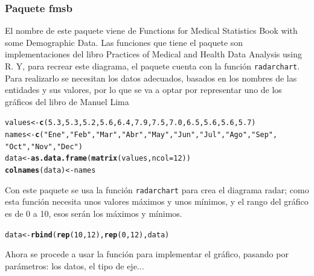 \documentclass{article}\usepackage[]{graphicx}\usepackage[]{color}
\makeatletter
\newcommand{\hlnum}[1]{\textcolor[rgb]{0.686,0.059,0.569}{#1}}%
\newcommand{\hlstr}[1]{\textcolor[rgb]{0.192,0.494,0.8}{#1}}%
\newcommand{\hlstd}[1]{\textcolor[rgb]{0.345,0.345,0.345}{#1}}%
\newcommand{\hlkwb}[1]{\textcolor[rgb]{0.69,0.353,0.396}{#1}}%
\newcommand{\hlkwc}[1]{\textcolor[rgb]{0.333,0.667,0.333}{#1}}%
\newcommand{\hlkwd}[1]{\textcolor[rgb]{0.737,0.353,0.396}{\textbf{#1}}}%
\newenvironment{kframe}{%
 \def\at@end@of@kframe{}%
 \ifinner\ifhmode%
  \def\at@end@of@kframe{\end{minipage}}%
  \begin{minipage}{\columnwidth}%
 \fi\fi%
 \def\FrameCommand##1{\hskip\@totalleftmargin \hskip-\fboxsep
 \colorbox{shadecolor}{##1}\hskip-\fboxsep
     \hskip-\linewidth \hskip-\@totalleftmargin \hskip\columnwidth}%
 \MakeFramed {\advance\hsize-\width
   \@totalleftmargin\z@ \linewidth\hsize
   \@setminipage}}%
 {\par\unskip\endMakeFramed%
 \at@end@of@kframe}
\newenvironment{knitrout}{}{} %
\makeatother
\begin{document}
\subsubsection{Paquete fmsb}
El nombre de este paquete %
viene de Functions for Medical Statistics Book with some Demographic Data. Las funciones que tiene el paquete son implementaciones del libro Practices of Medical and Health Data Analysis using R. Y, para recrear este diagrama, el paquete cuenta con la funci\'on \texttt{radarchart}.
Para realizarlo se necesitan los datos adecuados, basados en los nombres de las entidades y sus valores, por lo que se va a optar por representar uno de los gr\'aficos del libro de Manuel Lima %
\begin{knitrout}
\color{fgcolor}\begin{kframe}
\begin{alltt}
\hlstd{values} \hlkwb{<-} \hlkwd{c}\hlstd{(}\hlnum{5.3}\hlstd{,} \hlnum{5.3}\hlstd{,} \hlnum{5.2}\hlstd{,} \hlnum{5.6}\hlstd{,} \hlnum{6.4}\hlstd{,} \hlnum{7.9}\hlstd{,} \hlnum{7.5}\hlstd{,} \hlnum{7.0}\hlstd{,} \hlnum{6.5}\hlstd{,} \hlnum{5.6}\hlstd{,} \hlnum{5.6}\hlstd{,} \hlnum{5.7}\hlstd{)}
\hlstd{names} \hlkwb{<-} \hlkwd{c}\hlstd{(}\hlstr{"Ene"}\hlstd{,} \hlstr{"Feb"}\hlstd{,} \hlstr{"Mar"}\hlstd{,} \hlstr{"Abr"}\hlstd{,} \hlstr{"May"}\hlstd{,} \hlstr{"Jun"}\hlstd{,} \hlstr{"Jul"}\hlstd{,} \hlstr{"Ago"}\hlstd{,} \hlstr{"Sep"}\hlstd{,}
           \hlstr{"Oct"}\hlstd{,} \hlstr{"Nov"}\hlstd{,} \hlstr{"Dec"}\hlstd{)}
\hlstd{data} \hlkwb{<-} \hlkwd{as.data.frame}\hlstd{(}\hlkwd{matrix}\hlstd{(values,} \hlkwc{ncol} \hlstd{=} \hlnum{12}\hlstd{))}
\hlkwd{colnames}\hlstd{(data)} \hlkwb{<-} \hlstd{names}
\end{alltt}
\end{kframe}
\end{knitrout}
Con este paquete se usa la funci\'on \texttt{radarchart} para crea el diagrama radar; como esta funci\'on necesita unos valores m\'aximos y unos m\'inimos, y el rango del gr\'afico es de 0 a 10, esos ser\'an los m\'aximos y m\'inimos.
\begin{knitrout}
\color{fgcolor}\begin{kframe}
\begin{alltt}
\hlstd{data} \hlkwb{<-} \hlkwd{rbind}\hlstd{(}\hlkwd{rep}\hlstd{(}\hlnum{10}\hlstd{,}\hlnum{12}\hlstd{),} \hlkwd{rep}\hlstd{(}\hlnum{0}\hlstd{,}\hlnum{12}\hlstd{), data)}
\end{alltt}
\end{kframe}
\end{knitrout}
Ahora se procede a usar la funci\'on para implementar el gr\'afico, pasando por par\'ametros: los datos, el tipo de eje...
\end{document}
